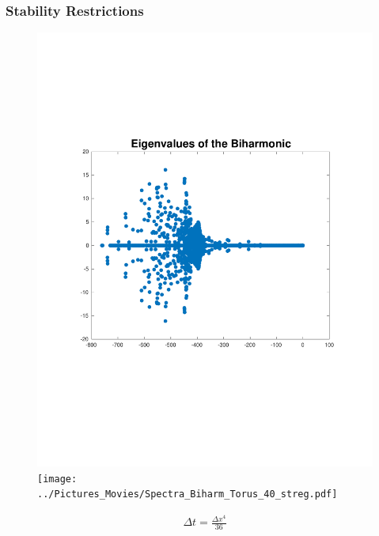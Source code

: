 \documentclass{beamer}
\begin{document}
\begin{frame}
\frametitle{Stability Restrictions}
 
\begin{figure}%
\centering
\includegraphics[scale = 0.35, trim = {2cm 7cm 2cm 6.5cm}, clip]{../Pictures_Movies/Spectra_Biharm_Torus_40.pdf}
\texttt{[image: ../Pictures\_Movies/Spectra\_Biharm\_Torus\_40\_streg.pdf]}
\end{figure}

\vspace{-10mm}
 
\begin{gather*}
\Delta t = \frac{\Delta x^4}{36}
\end{gather*}
 
\end{frame} 
 
 
% 
\end{document}
